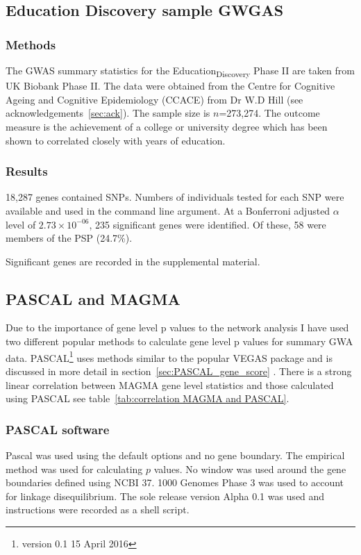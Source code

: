 \subsection{Education Discovery sample GWGAS}
\label{sec:UKBB Education discovery GWGAS}
\subsubsection{Methods}
The GWAS summary statistics for the Education\textsubscript{Discovery} Phase II are taken from UK Biobank Phase II. The data were obtained from the Centre for Cognitive Ageing and Cognitive Epidemiology (CCACE) from Dr W.D Hill (see acknowledgements~\ref{sec:ack}). The sample size is $n$=273,274. The outcome measure is the achievement of a college or university degree which has been shown to correlated closely with years of education\cite{rietveld2013gwas}.

\subsubsection{Results}
18,287 genes contained SNPs. Numbers of individuals tested for each SNP were available and used in the command line argument. At a Bonferroni adjusted $\alpha$ level of $2.73 \times 10^{-06}$, 235 significant genes were identified. Of these, 58 were members of the PSP (24.7\%).  

Significant genes are recorded in the supplemental material. 


\subsection{PASCAL and MAGMA}
\label{sec:compare pascal and magma}
Due to the importance of gene level p values to the network analysis I have used two different popular methods to calculate gene level p values for summary GWA data. PASCAL\footnote{version 0.1 15 April 2016} uses methods similar to the popular VEGAS package and is discussed in more detail in section~\ref{sec:PASCAL_gene_score} \cite{lamparter2016fast}. There is a strong linear correlation between MAGMA gene level statistics and those calculated using PASCAL see table~\ref{tab:correlation MAGMA and PASCAL}. 

\subsubsection{PASCAL software}
\label{sec:PASCAL methods}
Pascal was used using the default options and no gene boundary. The empirical method was used for calculating $p$ values. No window was used around the gene boundaries defined using NCBI 37. 1000 Genomes Phase 3 was used to account for linkage disequilibrium. The sole release version  Alpha 0.1 was used and instructions were recorded as a shell script. 

